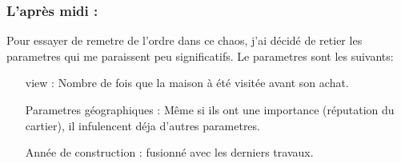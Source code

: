 \subsubsection*{L'après midi :}
Pour essayer de remetre de l'ordre dans ce chaos,
j'ai décidé de retier les parametres qui me paraissent peu significatifs.
Le parametres sont les suivants:
\begin{itemize}
    \item[view :] Nombre de fois que la maison à été visitée avant son achat.
    \item[Parametres géographiques :]
        Même si ils ont une importance (réputation du cartier),
        il infulencent déja d'autres parametres.
    \item[Année de construction :] fusionné avec les derniers travaux.
\end{itemize}

